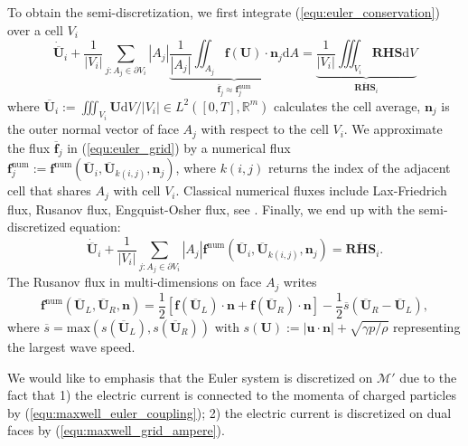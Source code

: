 \documentclass{article}
\begin{document}
To obtain the semi-discretization, we first integrate (\ref{equ:euler_conservation}) over a cell $V_i$ 
\begin{equation} \label{equ:euler_grid} 
    \dot{\overline{\mathbf{U}}}_i + \frac{1}{|V_i|}\sum_{j:A_j\in\partial V_i} |A_j|\underbrace{\frac{1}{|A_j|}\iint_{A_j}\mathbf{f}(\mathbf{U})\cdot \mathbf{n}_j \text{d}A}_{\overline{\mathbf{f}}_j \approx \mathbf{f}^\text{num}_j} = \underbrace{\frac{1}{|V_i|}\iiint_{V_i} \mathbf{RHS} \text{d}V}_{\overline{\mathbf{RHS}}_i}
\end{equation}
where $\overline{\mathbf{U}}_i := \iiint_{V_i} \mathbf{U} \text{d}V / |V_i| \in L^2([0,T],\mathbb{R}^m)$ calculates the cell average, $\mathbf{n}_j$ is the outer normal vector of face $A_j$ with respect to the cell $V_i$. We approximate the flux $\overline{\mathbf{f}}_j$ in (\ref{equ:euler_grid}) by a numerical flux $\mathbf{f}^\text{num}_j := \mathbf{f}^\text{num}\left(\overline{\mathbf{U}}_i, \overline{\mathbf{U}}_{k(i,j)}, \mathbf{n}_j\right)$, where $k(i,j)$ returns the index of the adjacent cell that shares $A_j$ with cell $V_i$. Classical numerical fluxes include Lax-Friedrich flux, Rusanov flux, Engquist-Osher flux, see \cite[][p. 44-46]{mishra_2019}. Finally, we end up with the semi-discretized equation:
\begin{equation}
    \dot{\overline{\mathbf{U}}}_i + \frac{1}{|V_i|}\sum_{j:A_j\in\partial V_i} |A_j| \mathbf{f}^\text{num}\left(\overline{\mathbf{U}}_i, \overline{\mathbf{U}}_{k(i,j)}, \mathbf{n}_j\right) = \overline{\mathbf{RHS}}_i.
    \label{equ:fvm}
\end{equation}
The Rusanov flux in multi-dimensions on face $A_j$ writes
\begin{equation} \label{equ:rusanov-flux-3d}
    \mathbf{f}^\text{num}\left(\overline{\mathbf{U}}_L, \overline{\mathbf{U}}_R, \mathbf{n}\right) = \frac{1}{2}\left[\mathbf{f}(\overline{\mathbf{U}}_L)\cdot\mathbf{n} + \mathbf{f}(\overline{\mathbf{U}}_R)\cdot\mathbf{n}\right] - \frac{1}{2}\overline{s}\left(\overline{\mathbf{U}}_R - \overline{\mathbf{U}}_L\right),  
\end{equation}
where $\overline{s} = \text{max}(s(\overline{\mathbf{U}}_L), s(\overline{\mathbf{U}}_R))$ with $s(\mathbf{U}) := |\mathbf{u}\cdot\mathbf{n}| + \sqrt{\gamma p/\rho}$ representing the largest wave speed. 

We would like to emphasis that the Euler system is discretized on $\mathcal{M}'$ due to the fact that 1) the electric current is connected to the momenta of charged particles by (\ref{equ:maxwell_euler_coupling}); 2) the electric current is discretized on dual faces by (\ref{equ:maxwell_grid_ampere}).
\end{document}
